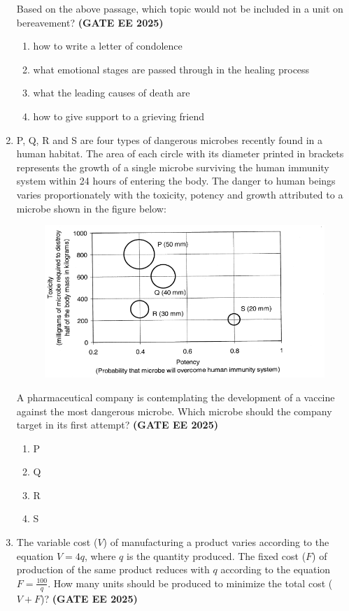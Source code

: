 \documentclass[journal,12pt,onecolumn]{IEEEtran}
\theoremstyle{remark}
\begin{document}
\begin{enumerate}
Based on the above passage, which topic would not be included in a unit on bereavement?  \hfill \textbf{(GATE EE 2025)}
\begin{enumerate}
    \item how to write a letter of condolence
    \item what emotional stages are passed through in the healing process
    \item what the leading causes of death are
    \item how to give support to a grieving friend
\end{enumerate}
\item  P, Q, R and S are four types of dangerous microbes recently found in a human habitat. The area of each circle with its diameter printed in brackets represents the growth of a single microbe surviving the human immunity system within 24 hours of entering the body. The danger to human beings varies proportionately with the toxicity, potency and growth attributed to a microbe shown in the figure below:
\begin{figure}[H]
    \centering
    \includegraphics[width=0.6\linewidth]{figs/fig12.png}
    \caption{ }
    \label{fig12}
\end{figure}
A pharmaceutical company is contemplating the development of a vaccine against the most dangerous microbe. Which microbe should the company target in its first attempt? \hfill \textbf{(GATE EE 2025)}
\begin{enumerate}
    \item P
    \item Q
    \item R
    \item S
\end{enumerate}
\item  The variable cost ($V$) of manufacturing a product varies according to the equation $V = 4q$, where $q$ is the quantity produced. The fixed cost ($F$) of production of the same product reduces with $q$ according to the equation $F = \frac{100}{q}$. How many units should be produced to minimize the total cost ($V+F$)? \hfill \textbf{(GATE EE 2025)}  

\end{enumerate}
\end{document}
